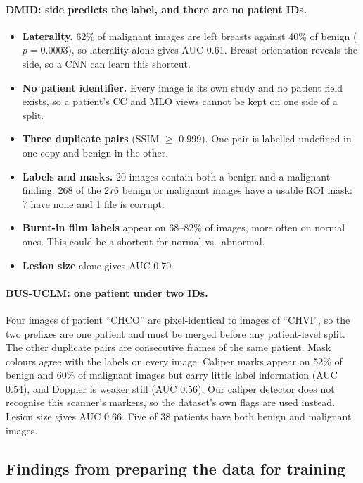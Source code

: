 \documentclass[11pt]{article}
\begin{document}
\paragraph{DMID: side predicts the label, and there are no patient IDs.}
\begin{itemize}
  \item \textbf{Laterality.} 62\% of malignant images are left breasts
  against 40\% of benign ($p=0.0003$), so laterality alone gives AUC 0.61.
  Breast orientation reveals the side, so a CNN can learn this shortcut.
  \item \textbf{No patient identifier.} Every image is its own study and
  no patient field exists, so a patient's CC and MLO views cannot be kept on
  one side of a split.
  \item \textbf{Three duplicate pairs} (SSIM $\geq$ 0.999). One pair is
  labelled undefined in one copy and benign in the other.
  \item \textbf{Labels and masks.} 20 images contain both a benign and a
  malignant finding. 268 of the 276 benign or malignant images have a usable
  ROI mask: 7 have none and 1 file is corrupt.
  \item \textbf{Burnt-in film labels} appear on 68--82\% of images, more often
  on normal ones. This could be a shortcut for normal vs.\ abnormal.
  \item \textbf{Lesion size} alone gives AUC 0.70.
\end{itemize}

\paragraph{BUS-UCLM: one patient under two IDs.} Four images of patient
``CHCO'' are pixel-identical to images of ``CHVI'', so the two prefixes are
one patient and must be merged before any patient-level split. The other
duplicate pairs are consecutive frames of the same patient. Mask colours agree
with the labels on every image. Caliper marks appear on 52\% of benign and
60\% of malignant images but carry little label information (AUC 0.54), and
Doppler is weaker still (AUC 0.56). Our caliper detector does not recognise
this scanner's markers, so the dataset's own flags are used instead. Lesion
size gives AUC 0.66. Five of 38 patients have both benign and malignant
images.

\subsection{Findings from preparing the data for training}
\label{sec:prep}
\end{document}
